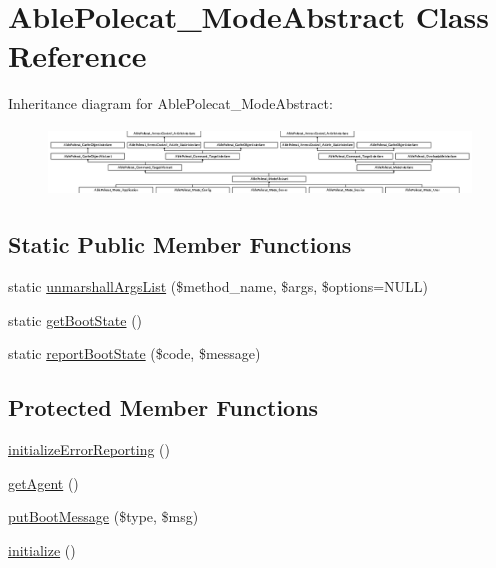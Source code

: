 \hypertarget{class_able_polecat___mode_abstract}{}\section{Able\+Polecat\+\_\+\+Mode\+Abstract Class Reference}
\label{class_able_polecat___mode_abstract}
Inheritance diagram for Able\+Polecat\+\_\+\+Mode\+Abstract\+:\begin{figure}[H]
\begin{center}
\leavevmode
\includegraphics[height=1.806452cm]{class_able_polecat___mode_abstract}
\end{center}
\end{figure}
\subsection*{Static Public Member Functions}
\begin{DoxyCompactItemize}
\item 
static \hyperlink{class_able_polecat___mode_abstract_a94d2e558bba777f54dcc10f1bfc4dca5}{unmarshall\+Args\+List} (\$method\+\_\+name, \$args, \$options=N\+U\+L\+L)
\item 
static \hyperlink{class_able_polecat___mode_abstract_a97d13ab5b7a6a28f4e248e9ab558113c}{get\+Boot\+State} ()
\item 
static \hyperlink{class_able_polecat___mode_abstract_a77f8a9bbe00fdd79a91f27268c88a7dd}{report\+Boot\+State} (\$code, \$message)
\end{DoxyCompactItemize}
\subsection*{Protected Member Functions}
\begin{DoxyCompactItemize}
\item 
\hyperlink{class_able_polecat___mode_abstract_a1edabbfbec5258ee9df5fc2f236f51b4}{initialize\+Error\+Reporting} ()
\item 
\hyperlink{class_able_polecat___mode_abstract_a14f9546bbf5895db0fe37673bab21850}{get\+Agent} ()
\item 
\hyperlink{class_able_polecat___mode_abstract_af811bf4cbcf41c821f1e1d2e80908ed1}{put\+Boot\+Message} (\$type, \$msg)
\item 
\hyperlink{class_able_polecat___mode_abstract_a91098fa7d1917ce4833f284bbef12627}{initialize} ()
\end{DoxyCompactItemize}
